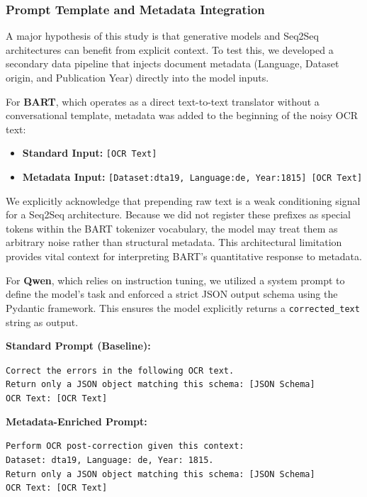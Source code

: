 \documentclass[11pt]{extarticle}
\begin{document}
\subsubsection{Prompt Template and Metadata Integration}
A major hypothesis of this study is that generative models and Seq2Seq architectures can benefit from explicit context. To test this, we developed a secondary data pipeline that injects document metadata (Language, Dataset origin, and Publication Year) directly into the model inputs.

For \textbf{BART}, which operates as a direct text-to-text translator without a conversational template, metadata was added to the beginning of the noisy OCR text:
\begin{itemize}
    \item \textbf{Standard Input:} \texttt{[OCR Text]}
    \item \textbf{Metadata Input:} \texttt{[Dataset:dta19, Language:de, Year:1815] [OCR Text]}
\end{itemize}

We explicitly acknowledge that prepending raw text is a weak conditioning signal for a Seq2Seq architecture. Because we did not register these prefixes as special tokens within the BART tokenizer vocabulary, the model may treat them as arbitrary noise rather than structural metadata. This architectural limitation provides vital context for interpreting BART's quantitative response to metadata.

For \textbf{Qwen}, which relies on instruction tuning, we utilized a system prompt to define the model's task and enforced a strict JSON output schema using the Pydantic framework. This ensures the model explicitly returns a \texttt{corrected\_text} string as output.

\noindent\textbf{Standard Prompt (Baseline):}
\begin{mdframed}[backgroundcolor=gray!10, linewidth=0pt, innertopmargin=10pt, innerbottommargin=10pt, innerleftmargin=10pt]
\small\texttt{Correct the errors in the following OCR text.}\\
\texttt{Return only a JSON object matching this schema: [JSON Schema]}\\
\texttt{OCR Text: [OCR Text]}
\end{mdframed}

\noindent\textbf{Metadata-Enriched Prompt:}
\begin{mdframed}[backgroundcolor=gray!10, linewidth=0pt, innertopmargin=10pt, innerbottommargin=10pt, innerleftmargin=10pt]
\small\texttt{Perform OCR post-correction given this context:\\
Dataset: dta19, Language: de, Year: 1815.}\\
\texttt{Return only a JSON object matching this schema: [JSON Schema]}\\
\texttt{OCR Text: [OCR Text]}
\end{mdframed}
\end{document}
